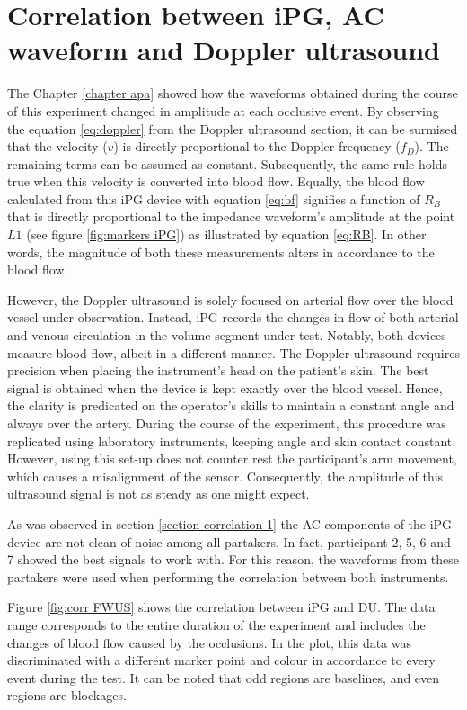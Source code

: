 \section{Correlation between iPG, AC waveform and Doppler ultrasound} %
\label{section correlation 2} 
The Chapter \ref{chapter apa} showed how the waveforms obtained during the course of this experiment changed in amplitude at each occlusive event. By observing the equation \ref{eq:doppler} from the Doppler ultrasound section, it can be surmised that the velocity ($v$) is directly proportional to the Doppler frequency ($f_D$). The remaining terms can be assumed as constant. Subsequently, the same rule holds true when this velocity is converted into blood flow. Equally, the blood flow calculated from this iPG device with equation \ref{eq:bf} signifies a function of $R_B$ that is directly proportional to the impedance waveform's amplitude at the point $L1$ (see figure \ref{fig:markers iPG}) as illustrated by equation \ref{eq:RB}. In other words, the magnitude of both these measurements alters in accordance to the blood flow.

However, the Doppler ultrasound is solely focused on arterial flow over the blood vessel under observation. Instead, iPG records the changes in flow of both arterial and venous circulation in the volume segment under test. Notably, both devices measure blood flow, albeit in a different manner. The Doppler ultrasound requires precision when placing the instrument's head on the patient's skin. The best signal is obtained when the device is kept exactly over the blood vessel. Hence, the clarity is predicated on the operator's skills to maintain a constant angle and always over the artery. During the course of the experiment, this procedure was replicated using laboratory instruments, keeping angle and skin contact constant. However, using this set-up does not counter rest the participant's arm movement, which causes a misalignment of the sensor. Consequently, the amplitude of this ultrasound signal is not as steady as one might expect. 

As was observed in section \ref{section correlation 1} the AC components of the iPG device are not clean of noise among all partakers. In fact, participant 2, 5, 6 and 7 showed the best signals to work with. For this reason, the waveforms from these partakers were used when performing the correlation between both instruments. 

Figure \ref{fig:corr FWUS} shows the correlation between iPG and DU. The data range corresponds to the entire duration of the experiment and includes the changes of blood flow caused by the occlusions. In the plot, this data was discriminated with a different marker point and colour in accordance to every event during the test. It can be noted that odd regions are baselines, and even regions are blockages.  


